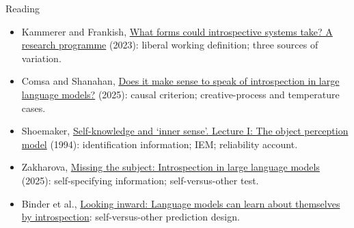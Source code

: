 \documentclass[aspectratio=169,11pt]{beamer}
\begin{document}
\begin{frame}[label=reading]{Reading}
\small
\begin{itemize}\setlength\itemsep{4pt}
  \item Kammerer and Frankish, \href{https://philarchive.org/archive/KAMWFC}{What forms could introspective systems take? A research programme} (2023): liberal working definition; three sources of variation.
  \item Comsa and Shanahan, \href{https://arxiv.org/abs/2506.05068}{Does it make sense to speak of introspection in large language models?} (2025): causal criterion; creative-process and temperature cases.
  \item Shoemaker, \href{https://philpapers.org/rec/SHOSAI-2}{Self-knowledge and `inner sense'. Lecture I: The object perception model} (1994): identification information; IEM; reliability account.
  \item Zakharova, \href{https://philarchive.org/rec/ZAKMTS}{Missing the subject: Introspection in large language models} (2025): self-specifying information; self-versus-other test.
  \item Binder et al., \href{https://arxiv.org/abs/2410.13787}{Looking inward: Language models can learn about themselves by introspection}: self-versus-other prediction design.
\end{itemize}
\end{frame}
\end{document}
